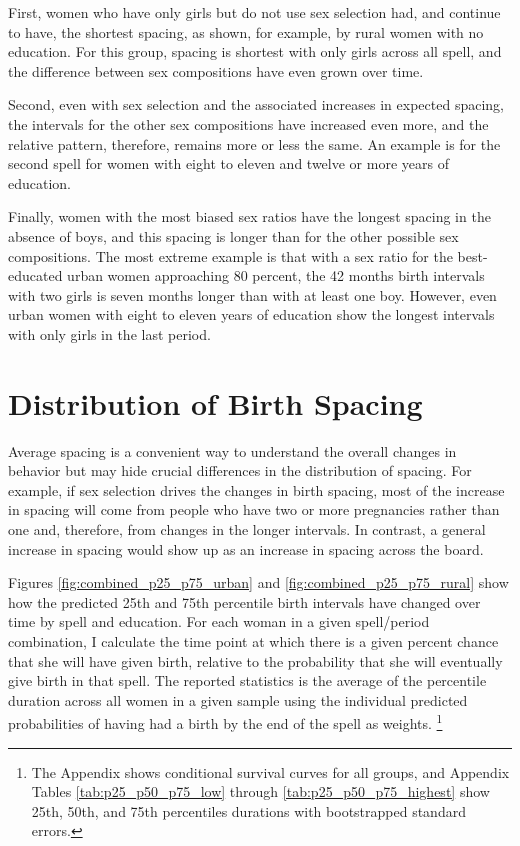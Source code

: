 \documentclass[12pt,letterpaper]{article}
\begin{document}
First, women who have only girls but do not use sex selection had, and continue to have,
the shortest spacing, as shown, for example, by rural women with no education.
For this group, spacing is shortest with only girls across all spell, and the difference
between sex compositions have even grown over time.

Second, even with sex selection and the associated increases in expected spacing, the
intervals for the other sex compositions have increased even more, and the relative 
pattern, therefore, remains more or less the same.
An example is for the second spell for women with eight to eleven
and twelve or more years of education.

Finally, women with the most biased sex ratios have the longest spacing in the 
absence of boys, and this spacing is longer than for the other possible sex 
compositions.
The most extreme example is that with a sex ratio for the best-educated urban women  
approaching 80 percent, the 42 months birth intervals with two girls is seven months 
longer than with at least one boy.
However, even urban women with eight to eleven years of education show the longest 
intervals with only girls in the last period.




\section{Distribution of Birth Spacing}

Average spacing is a convenient way to understand the overall changes in behavior but may 
hide crucial differences in the distribution of spacing.
For example, if sex selection drives the changes in birth spacing, most of the increase in 
spacing will come from people who have two or more pregnancies rather than one and,
therefore, from changes in the longer intervals.
In contrast, a general increase in spacing would show up as an increase in spacing across 
the board.

Figures \ref{fig:combined_p25_p75_urban} and \ref{fig:combined_p25_p75_rural} 
show how the predicted 25th and 75th percentile birth intervals have changed over time 
by spell and education.
For each woman in a given spell/period combination, I calculate the time point at 
which there is a given percent chance that she will have given birth, relative to the
probability that she will eventually give birth in that spell.
The reported statistics is the average of the percentile duration
across all women in a given sample using the individual predicted
probabilities of having had a birth by the end of the spell as weights.%
\footnote{
The Appendix shows conditional survival curves for all groups, and 
Appendix Tables \ref{tab:p25_p50_p75_low} through \ref{tab:p25_p50_p75_highest} 
show 25th, 50th, and 75th percentiles durations with bootstrapped standard errors.
}
\end{document}
